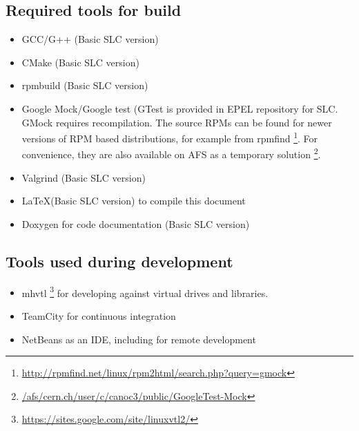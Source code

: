 \subsection{Required tools for build}
\begin{itemize}
\item{}GCC/G++ (Basic SLC version)
\item{}CMake (Basic SLC version)
\item{}rpmbuild (Basic SLC version)
\item{}Google Mock/Google test (GTest is provided in EPEL repository for SLC. 
  GMock requires recompilation. The source RPMs can be found for newer versions of RPM based distributions, for example from rpmfind 
  \footnote{ \href{http://rpmfind.net/linux/rpm2html/search.php?query=gmock}{http://rpmfind.net/linux/rpm2html/search.php?query=gmock} }.
 For convenience, 
  they are also available on AFS as a temporary solution
      \footnote{ \href{file:///afs/cern.ch/user/c/canoc3/public/GoogleTest-Mock}{/afs/cern.ch/user/c/canoc3/public/GoogleTest-Mock} }.
\item{}Valgrind (Basic SLC version)
\item{}\LaTeX (Basic SLC version) to compile this document
\item{}Doxygen for code documentation (Basic SLC version)
\end{itemize}

\subsection{Tools used during development}
\begin{itemize}
\item{}mhvtl \footnote{ \href{https://sites.google.com/site/linuxvtl2/}{https://sites.google.com/site/linuxvtl2/} } for developing against virtual drives and libraries.
\item{}TeamCity for continuous integration
\item{}NetBeans as an IDE, including for remote development\
\end{itemize}

